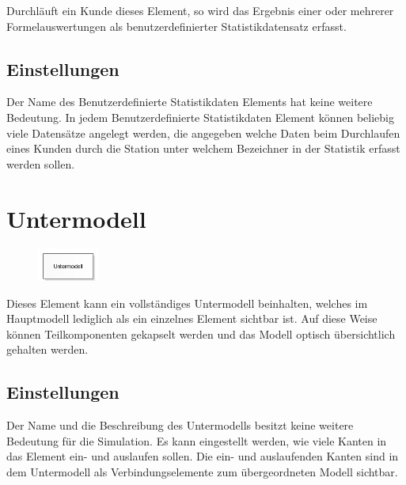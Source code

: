 Durchläuft ein Kunde dieses Element, so wird das Ergebnis einer oder mehrerer Formelauswertungen
als benutzerdefinierter Statistikdatensatz erfasst.

\subsection*{Einstellungen}

Der Name des Benutzerdefinierte Statistikdaten Elements hat keine weitere Bedeutung.
In jedem Benutzerdefinierte Statistikdaten Element können beliebig viele Datensätze
angelegt werden, die angegeben welche Daten beim Durchlaufen eines Kunden durch die
Station unter welchem Bezeichner in der Statistik erfasst werden sollen.


\section{Untermodell}
\label{ref:ModelElementSub}

\begin{figure}
\vspace{-22pt}
\includegraphics[width=2cm]{imageModelElementSub.png}
\vspace{-22pt}
\end{figure}

Dieses Element kann ein vollständiges Untermodell beinhalten, welches im Hauptmodell
lediglich als ein einzelnes Element sichtbar ist. Auf diese Weise können Teilkomponenten
gekapselt werden und das Modell optisch übersichtlich gehalten werden.

\subsection*{Einstellungen}

Der Name und die Beschreibung des Untermodells besitzt keine weitere Bedeutung für die Simulation.
Es kann eingestellt werden, wie viele Kanten in das Element ein- und auslaufen sollen.
Die ein- und auslaufenden Kanten sind in dem Untermodell als Verbindungselemente zum
übergeordneten Modell sichtbar.





